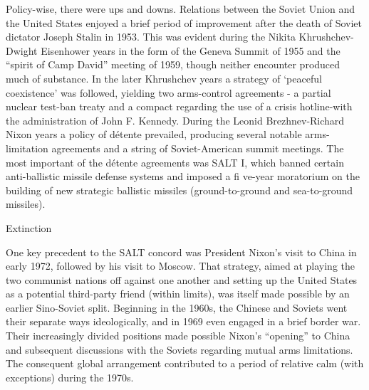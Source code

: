 \documentclass[
  openany]{book}
\begin{document}
Policy-wise, there were ups and downs. Relations between the Soviet Union and the United States enjoyed a brief period of improvement after the death of Soviet dictator Joseph Stalin in 1953. This was evident during the Nikita Khrushchev-Dwight Eisenhower years in the form of the Geneva Summit of 1955 and the ``spirit of Camp David'' meeting of 1959, though neither encounter produced much of substance. In the later Khrushchev years a strategy of `peaceful coexistence' was followed, yielding two arms-control agreements - a partial nuclear test-ban treaty and a compact regarding the use of a crisis hotline-with the administration of John F. Kennedy. During the Leonid Brezhnev-Richard Nixon years a policy of détente prevailed, producing several notable arms-limitation agreements and a string of Soviet-American summit meetings. The most important of the détente agreements was SALT I, which banned certain anti-ballistic missile defense systems and imposed a fi ve-year moratorium on the building of new strategic ballistic missiles (ground-to-ground and sea-to-ground missiles).

Extinction

One key precedent to the SALT concord was President Nixon's visit to China in early 1972, followed by his visit to Moscow. That strategy, aimed at playing the two communist nations off against one another and setting up the United States as a potential third-party friend (within limits), was itself made possible by an earlier Sino-Soviet split. Beginning in the 1960s, the Chinese and Soviets went their separate ways ideologically, and in 1969 even engaged in a brief border war. Their increasingly divided positions made possible Nixon's ``opening'' to China and subsequent discussions with the Soviets regarding mutual arms limitations. The consequent global arrangement contributed to a period of relative calm (with exceptions) during the 1970s.
\end{document}
